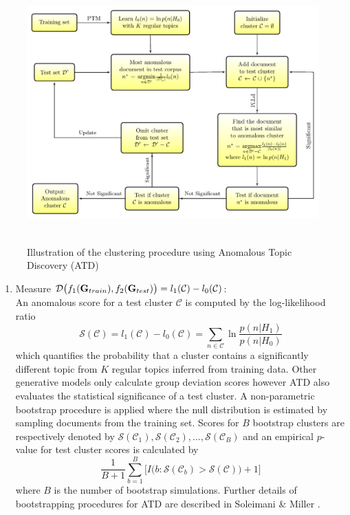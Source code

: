 \begin{enumerate}[2.]
\begin{figure}[h]
\centering
\includegraphics[width=14cm, height=10cm, trim=0cm 0cm 0cm 0cm]
{FIGURES/ATDfigure} 
\caption{ Illustration of the clustering procedure using Anomalous Topic Discovery (ATD)  }
\label{Fig:ATD}
\end{figure}

\end{enumerate}
%
\begin{enumerate}[3.] 
\item Measure $ \mathcal{D}\big(f_1 ({\bf G}_{train}) , f_2({\bf G}_{test} )\big )= l_1(\mathcal{C})  -l_0(\mathcal{C})$: \\
An anomalous score for a test cluster $\mathcal{C}$ is computed by the log-likelihood ratio  
\[\mathcal{S}(\mathcal{C})= l_1(\mathcal{C})  -l_0(\mathcal{C}) =   \sum_{n  \in \mathcal{C} } \ln \frac{p( n| H_1 )} {p( n| H_0 )} \]
which quantifies the probability that a cluster contains a significantly different topic from $K$ regular topics inferred from  training data. Other generative models only calculate group deviation scores however ATD also evaluates the statistical significance of a test cluster. 
  A non-parametric bootstrap procedure is  applied  where the null distribution is estimated by sampling documents from the  training set.  Scores for $B$ bootstrap clusters are respectively denoted by    $\mathcal{S}(\mathcal{C}_1),\mathcal{S}(\mathcal{C}_2),\dots,\mathcal{S}(\mathcal{C}_B)$ and an empirical $p$-value for test cluster scores is calculated by    
\[ \frac{1} {B+1} \sum_{b=1}^B \Big[I \Big(b : \mathcal{S}(\mathcal{C}_b) > \mathcal{S}(\mathcal{C}) \Big)+1 \Big] \]
where $B$ is the number of bootstrap simulations. 
  Further details of bootstrapping procedures for ATD are described in Soleimani \& Miller \cite{ATD}. 
\end{enumerate}
